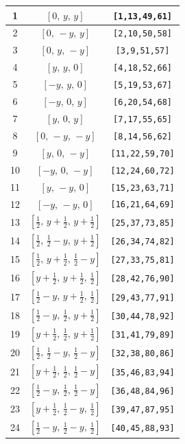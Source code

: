\documentclass[fleqn,8pt]{jsarticle}
\begin{document}
\begin{longtable}{ccc}
1 & $\left[ 0,\, y,\, y \right]$ & {\tt [1,13,49,61]} \\ \hline
2 & $\left[ 0,\, - y,\, y \right]$ & {\tt [2,10,50,58]} \\ \hline
3 & $\left[ 0,\, y,\, - y \right]$ & {\tt [3,9,51,57]} \\ \hline
4 & $\left[ y,\, y,\, 0 \right]$ & {\tt [4,18,52,66]} \\ \hline
5 & $\left[ - y,\, y,\, 0 \right]$ & {\tt [5,19,53,67]} \\ \hline
6 & $\left[ - y,\, 0,\, y \right]$ & {\tt [6,20,54,68]} \\ \hline
7 & $\left[ y,\, 0,\, y \right]$ & {\tt [7,17,55,65]} \\ \hline
8 & $\left[ 0,\, - y,\, - y \right]$ & {\tt [8,14,56,62]} \\ \hline
9 & $\left[ y,\, 0,\, - y \right]$ & {\tt [11,22,59,70]} \\ \hline
10 & $\left[ - y,\, 0,\, - y \right]$ & {\tt [12,24,60,72]} \\ \hline
11 & $\left[ y,\, - y,\, 0 \right]$ & {\tt [15,23,63,71]} \\ \hline
12 & $\left[ - y,\, - y,\, 0 \right]$ & {\tt [16,21,64,69]} \\ \hline
13 & $\left[ \frac{1}{2},\, y + \frac{1}{2},\, y + \frac{1}{2} \right]$ & {\tt [25,37,73,85]} \\ \hline
14 & $\left[ \frac{1}{2},\, \frac{1}{2} - y,\, y + \frac{1}{2} \right]$ & {\tt [26,34,74,82]} \\ \hline
15 & $\left[ \frac{1}{2},\, y + \frac{1}{2},\, \frac{1}{2} - y \right]$ & {\tt [27,33,75,81]} \\ \hline
16 & $\left[ y + \frac{1}{2},\, y + \frac{1}{2},\, \frac{1}{2} \right]$ & {\tt [28,42,76,90]} \\ \hline
17 & $\left[ \frac{1}{2} - y,\, y + \frac{1}{2},\, \frac{1}{2} \right]$ & {\tt [29,43,77,91]} \\ \hline
18 & $\left[ \frac{1}{2} - y,\, \frac{1}{2},\, y + \frac{1}{2} \right]$ & {\tt [30,44,78,92]} \\ \hline
19 & $\left[ y + \frac{1}{2},\, \frac{1}{2},\, y + \frac{1}{2} \right]$ & {\tt [31,41,79,89]} \\ \hline
20 & $\left[ \frac{1}{2},\, \frac{1}{2} - y,\, \frac{1}{2} - y \right]$ & {\tt [32,38,80,86]} \\ \hline
21 & $\left[ y + \frac{1}{2},\, \frac{1}{2},\, \frac{1}{2} - y \right]$ & {\tt [35,46,83,94]} \\ \hline
22 & $\left[ \frac{1}{2} - y,\, \frac{1}{2},\, \frac{1}{2} - y \right]$ & {\tt [36,48,84,96]} \\ \hline
23 & $\left[ y + \frac{1}{2},\, \frac{1}{2} - y,\, \frac{1}{2} \right]$ & {\tt [39,47,87,95]} \\ \hline
24 & $\left[ \frac{1}{2} - y,\, \frac{1}{2} - y,\, \frac{1}{2} \right]$ & {\tt [40,45,88,93]} \\
\end{longtable}
\end{document}
